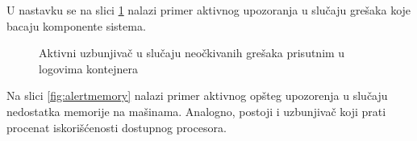 \documentclass[12pt,oneside]{memoir}
\begin{document}
U nastavku se na slici \ref{fig:alertex} nalazi primer aktivnog upozoranja u slučaju grešaka koje bacaju komponente sistema.

\begin{figure}[!ht]
  \centering
  \caption{Aktivni uzbunjivač u slučaju neočkivanih grešaka prisutnim u logovima kontejnera}
  \label{fig:alertex}
\end{figure}

Na slici \ref{fig:alertmemory} nalazi primer aktivnog opšteg upozorenja u slučaju nedostatka memorije na mašinama. Analogno, postoji i uzbunjivač koji prati procenat iskorišćenosti dostupnog procesora.
\end{document}
